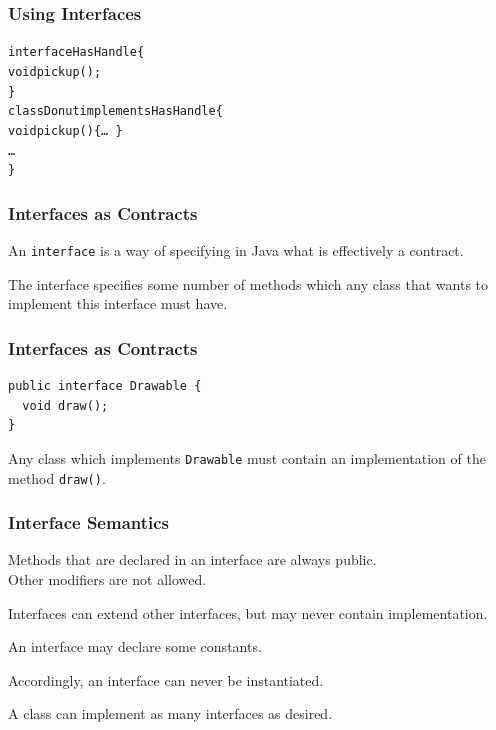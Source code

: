 \begin{frame}
\frametitle{Using Interfaces}

\begin{changemargin}{2.5cm}
\begin{alltt}
  interface HasHandle \{ \\
\qquad    void pickup(); \\
  \}\\[1em]
  class Donut \alert{implements} HasHandle \{ \\
\qquad    void pickup() \{ \ldots~\}  \\
\qquad    \ldots \\
  \}\\
\end{alltt}
\end{changemargin}

\end{frame}

\begin{frame}
\frametitle{Interfaces as Contracts}
\begin{changemargin}{1cm}

An \texttt{interface} is a way of specifying in Java what is effectively a contract. 

The interface specifies some number of methods which any class that wants to implement this interface must have.

\end{changemargin}
\end{frame}


\begin{frame}[fragile]
\frametitle{Interfaces as Contracts}
\begin{changemargin}{1cm}

\begin{verbatim}
public interface Drawable {
  void draw();
}
\end{verbatim}

Any class which implements \texttt{Drawable} must contain an implementation of the method \texttt{draw()}.

\end{changemargin}
\end{frame}

\begin{frame}
\frametitle{Interface Semantics}
\begin{changemargin}{1cm}

Methods that are declared in an interface are always public.\\
\quad Other modifiers are not allowed.

Interfaces can extend other interfaces, but may never contain implementation. 

An interface may declare some constants.

Accordingly, an interface can never be instantiated. 

A class can implement as many interfaces as desired.

\end{changemargin}
\end{frame}

